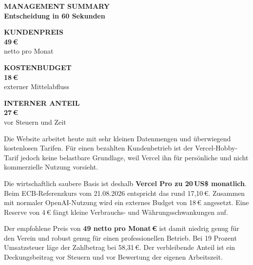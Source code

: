 \documentclass[11pt,a4paper]{article}
\newcommand{\eur}[1]{#1\,€}
\newcommand{\usd}[1]{#1\,US\$}
\begin{document}
\hypersetup{pageanchor=true}
\nopagecolor
\color{NordInk}

{\sffamily\footnotesize\bfseries\color{NordBlue}\MakeUppercase{Management Summary}}\\[2mm]
{\sffamily\LARGE\bfseries\color{NordNavy}Entscheidung in 60 Sekunden}

\vspace{3mm}
\noindent
\begin{minipage}[t]{0.315\textwidth}
  \begin{metricbox}
    {\sffamily\scriptsize\bfseries\color{NordMuted}\MakeUppercase{Kundenpreis}}\\[1.5mm]
    {\sffamily\fontsize{23}{25}\selectfont\bfseries\color{NordNavy}\eur{49}}\\[-0.5mm]
    {\sffamily\scriptsize\color{NordMuted}netto pro Monat}
  \end{metricbox}
\end{minipage}\hfill
\begin{minipage}[t]{0.315\textwidth}
  \begin{metricbox}
    {\sffamily\scriptsize\bfseries\color{NordMuted}\MakeUppercase{Kostenbudget}}\\[1.5mm]
    {\sffamily\fontsize{23}{25}\selectfont\bfseries\color{NordBlue}\eur{18}}\\[-0.5mm]
    {\sffamily\scriptsize\color{NordMuted}externer Mittelabfluss}
  \end{metricbox}
\end{minipage}\hfill
\begin{minipage}[t]{0.315\textwidth}
  \begin{metricbox}
    {\sffamily\scriptsize\bfseries\color{NordMuted}\MakeUppercase{Interner Anteil}}\\[1.5mm]
    {\sffamily\fontsize{23}{25}\selectfont\bfseries\color{NordGreen}\eur{27}}\\[-0.5mm]
    {\sffamily\scriptsize\color{NordMuted}vor Steuern und Zeit}
  \end{metricbox}
\end{minipage}

\begin{summarybox}
  Die Website arbeitet heute mit sehr kleinen Datenmengen und überwiegend kostenlosen Tarifen. Für einen bezahlten Kundenbetrieb ist der Vercel-Hobby-Tarif jedoch keine belastbare Grundlage, weil Vercel ihn für persönliche und nicht kommerzielle Nutzung vorsieht.

  Die wirtschaftlich saubere Basis ist deshalb \textbf{Vercel Pro zu \usd{20} monatlich}. Beim ECB-Referenzkurs vom 21.08.2026 entspricht das rund \eur{17,10}. Zusammen mit normaler OpenAI-Nutzung wird ein externes Budget von \eur{18} angesetzt. Eine Reserve von \eur{4} fängt kleine Verbrauchs- und Währungsschwankungen auf.

  Der empfohlene Preis von \textbf{\eur{49 netto pro Monat}} ist damit niedrig genug für den Verein und robust genug für einen professionellen Betrieb. Bei 19 Prozent Umsatzsteuer läge der Zahlbetrag bei \eur{58,31}. Der verbleibende Anteil ist ein Deckungsbeitrag vor Steuern und vor Bewertung der eigenen Arbeitszeit.
\end{summarybox}
\end{document}
